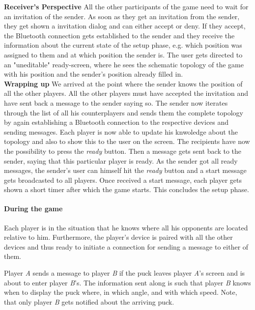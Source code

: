 \documentclass{report}
\begin{document}
\textbf{Receiver's Perspective} All the other participants of the game need to wait for an invitation of the sender. As soon as they get an invitation from the sender, they get shown a invitation dialog and can either accept or deny. If they accept, the Bluetooth connection gets established to the sender and they receive the information about the current state of the setup phase, e.g. which position was assigned to them and at which position the sender is. The user gets directed to an "uneditable" ready-screen, where he sees the schematic topology of the game with his position and the sender's position already filled in.\\

\textbf{Wrapping up} We arrived at the point where the sender knows the position of all the other players. All the other players must have accepted the invitation and have sent back a message to the sender saying so. The sender now iterates through  the list of all his counterplayers and sends them the complete topology by again establishing a Bluetooth connection to the respective devices and sending messages. Each player is now able to update his knwoledge about the topology and also to show this to the user on the screen. The recipients have now the possibility to press the \textit{ready} button. Then a message gets sent back to the sender, saying that this particular player is ready. As the sender got all ready messages, the sender's user can himself hit the \textit{ready} button and a start message gets broadcasted to all players. Once received a start message, each player gets shown a short timer after which the game starts. This concludes the setup phase.

\paragraph{During the game} Each player is in the situation that he knows where all his opponents are located relative to him. Furthermore, the player's device is paired with all the other devices and thus ready to initiate a connection for sending a message to either of them.

Player \textit{A} sends a message to player \textit{B} if the puck leaves player \textit{A}'s screen and is about to enter player \textit{B}'s. The information sent along is such that player \textit{B} knows when to display the puck where, in which angle, and with which speed. Note, that only player \textit{B} gets notified about the arriving puck.
\end{document}
